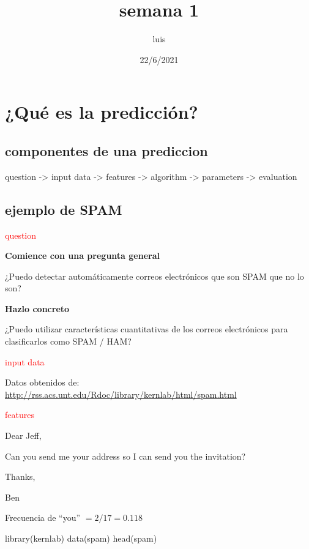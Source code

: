 \documentclass[
]{article}
\title{semana 1}
\author{luis}
\date{22/6/2021}
\newenvironment{Shaded}{\begin{snugshade}}{\end{snugshade}}
\newcommand{\FunctionTok}[1]{\textcolor[rgb]{0.00,0.00,0.00}{#1}}
\newcommand{\NormalTok}[1]{#1}
\begin{document}
\maketitle

\tableofcontents

\hypertarget{quuxe9-es-la-predicciuxf3n}{%
\section{¿Qué es la predicción?}\label{quuxe9-es-la-predicciuxf3n}}

\hypertarget{componentes-de-una-prediccion}{%
\subsection{componentes de una
prediccion}\label{componentes-de-una-prediccion}}

question -\textgreater{} input data -\textgreater{} features
-\textgreater{} algorithm -\textgreater{} parameters -\textgreater{}
evaluation

\hypertarget{ejemplo-de-spam}{%
\subsection{ejemplo de SPAM}\label{ejemplo-de-spam}}

\textcolor{red}{question}

\textbf{Comience con una pregunta general}

¿Puedo detectar automáticamente correos electrónicos que son SPAM que no
lo son?

\textbf{Hazlo concreto}

¿Puedo utilizar características cuantitativas de los correos
electrónicos para clasificarlos como SPAM / HAM?

\textcolor{red}{input data}

Datos obtenidos de:
\url{http://rss.acs.unt.edu/Rdoc/library/kernlab/html/spam.html}

\textcolor{red}{features}

Dear Jeff,

Can you send me your address so I can send you the invitation?

Thanks,

Ben

Frecuencia de ``you'' \(= 2/17 = 0.118\)

\begin{Shaded}
\begin{Highlighting}[]
\FunctionTok{library}\NormalTok{(kernlab)}
\FunctionTok{data}\NormalTok{(spam)}
\FunctionTok{head}\NormalTok{(spam)}
\end{Highlighting}
\end{Shaded}
\end{document}
